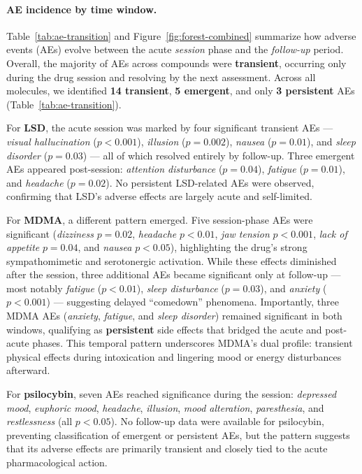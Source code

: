 \paragraph{AE incidence by time window.}
Table~\ref{tab:ae-transition} and Figure~\ref{fig:forest-combined} summarize how adverse events (AEs) evolve between the acute \textit{session} phase and the \textit{follow-up} period.  
Overall, the majority of AEs across compounds were \textbf{transient}, occurring only during the drug session and resolving by the next assessment.  
Across all molecules, we identified \textbf{14 transient}, \textbf{5 emergent}, and only \textbf{3 persistent} AEs (Table~\ref{tab:ae-transition}).  

For \textbf{LSD}, the acute session was marked by four significant transient AEs --- \textit{visual hallucination} ($p<0.001$), \textit{illusion} ($p=0.002$), \textit{nausea} ($p=0.01$), and \textit{sleep disorder} ($p=0.03$) --- all of which resolved entirely by follow-up. Three emergent AEs appeared post-session: \textit{attention disturbance} ($p=0.04$), \textit{fatigue} ($p=0.01$), and \textit{headache} ($p=0.02$).  
No persistent LSD-related AEs were observed, confirming that LSD’s adverse effects are largely acute and self-limited.

For \textbf{MDMA}, a different pattern emerged. Five session-phase AEs were significant (\textit{dizziness} $p=0.02$, \textit{headache} $p<0.01$, \textit{jaw tension} $p<0.001$, \textit{lack of appetite} $p=0.04$, and \textit{nausea} $p<0.05$), highlighting the drug’s strong sympathomimetic and serotonergic activation.  
While these effects diminished after the session, three additional AEs became significant only at follow-up --- most notably \textit{fatigue} ($p<0.01$), \textit{sleep disturbance} ($p=0.03$), and \textit{anxiety} ($p<0.001$) --- suggesting delayed “comedown” phenomena.  
Importantly, three MDMA AEs (\textit{anxiety}, \textit{fatigue}, and \textit{sleep disorder}) remained significant in both windows, qualifying as \textbf{persistent} side effects that bridged the acute and post-acute phases.  
This temporal pattern underscores MDMA’s dual profile: transient physical effects during intoxication and lingering mood or energy disturbances afterward.

For \textbf{psilocybin}, seven AEs reached significance during the session: \textit{depressed mood}, \textit{euphoric mood}, \textit{headache}, \textit{illusion}, \textit{mood alteration}, \textit{paresthesia}, and \textit{restlessness} (all $p<0.05$).  
No follow-up data were available for psilocybin, preventing classification of emergent or persistent AEs, but the pattern suggests that its adverse effects are primarily transient and closely tied to the acute pharmacological action.

